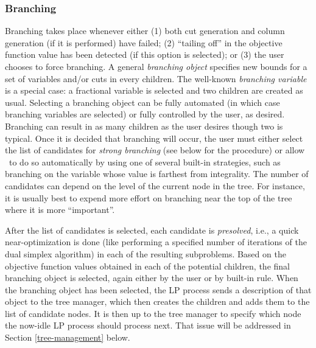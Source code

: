 
\subsubsection{Branching}
\label{branching}

Branching takes place whenever either (1) both cut generation and
column generation (if it is performed) have failed; (2) ``tailing
off'' in the objective function value has been detected (if this
option is selected); or (3) the user chooses to force
branching. A general {\em branching object} specifies new bounds for a set of
variables and/or cuts in every children. The well-known 
{\em branching variable} is a special case: a fractional variable is selected
and two children are created as usual. Selecting a branching object can be
fully automated (in which case branching variables are selected) or fully
controlled by the user, as desired. Branching can result in as many children
as the user desires though two is typical.
Once it is decided that branching will occur, the user must
either select the list of candidates for {\em strong branching} (see
below for the procedure) or allow \BB\ to do so automatically
by using one of several built-in strategies, such as branching on the
variable whose value is farthest from integrality. The number of
candidates can depend on the level of the current node in the tree.
For instance, it is usually best to expend more effort on branching
near the top of the tree where it is more ``important''.

After the list of candidates is selected, each candidate is {\em
presolved}, i.e., a quick near-optimization is done (like performing a
specified number of iterations of the dual simplex algorithm) 
in each of the resulting subproblems. Based on
the objective function values obtained in each of the potential
children, the final branching object is selected, again either by the
user or by built-in rule. When the branching object has been selected,
the LP process sends a description of that object to the tree manager,
which then creates the children and adds them to the list of candidate
nodes. It is then up to the tree manager to specify which node the
now-idle LP process should process next. That issue will be addressed
in Section \ref{tree-management} below.

